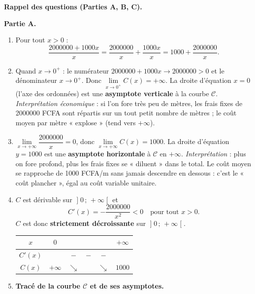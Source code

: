 \documentclass[11pt]{article}
\begin{document}
\begin{exoresolu}
\textbf{Rappel des questions (Parties A, B, C).}
\tcblower

\textbf{Partie A.}
\begin{enumerate}
\item Pour tout $x > 0$ :
      \[
      \frac{\num{2000000} + \num{1000}x}{x}
      = \frac{\num{2000000}}{x} + \frac{\num{1000}x}{x}
      = \num{1000} + \frac{\num{2000000}}{x}.
      \]
\item Quand $x \to 0^+$ : le numérateur $\num{2000000} + \num{1000}x \to \num{2000000} > 0$ et le dénominateur $x \to 0^+$.
      Donc $\lim\limits_{x \to 0^+} C(x) = +\infty$.
      La droite d'équation $x = 0$ (l'axe des ordonnées) est une \textbf{asymptote verticale} à la courbe $\mathcal{C}$.
      \emph{Interprétation économique} : si l'on fore très peu de mètres, les frais fixes de \num{2000000} FCFA sont répartis sur un tout petit nombre de mètres ; le coût moyen par mètre « explose » (tend vers $+\infty$).
\item $\lim\limits_{x \to +\infty} \dfrac{\num{2000000}}{x} = 0$, donc $\lim\limits_{x \to +\infty} C(x) = \num{1000}$.
      La droite d'équation $y = \num{1000}$ est une \textbf{asymptote horizontale} à $\mathcal{C}$ en $+\infty$.
      \emph{Interprétation} : plus on fore profond, plus les frais fixes se « diluent » dans le total. Le coût moyen se rapproche de \num{1000} FCFA/m sans jamais descendre en dessous : c'est le « coût plancher », égal au coût variable unitaire.
\item $C$ est dérivable sur $\mathopen]0\,;\,+\infty\mathclose[$ et
      \[
      C'(x) = -\frac{\num{2000000}}{x^2} < 0 \quad \text{pour tout } x > 0.
      \]
      $C$ est donc \textbf{strictement décroissante} sur $\mathopen]0\,;\,+\infty\mathclose[$.
      \begin{center}
      \begin{tabular}{|c|ccccc|}
      \hline
      $x$ & $0$ & & & & $+\infty$ \\
      \hline
      $C'(x)$ & & $-$ & $-$ & $-$ & \\
      \hline
      $C(x)$ & $+\infty$ & $\searrow$ & & $\searrow$ & $\num{1000}$ \\
      \hline
      \end{tabular}
      \end{center}
\item \textbf{Tracé de la courbe $\mathcal{C}$ et de ses asymptotes.}
\end{enumerate}


\end{exoresolu}
\end{document}

